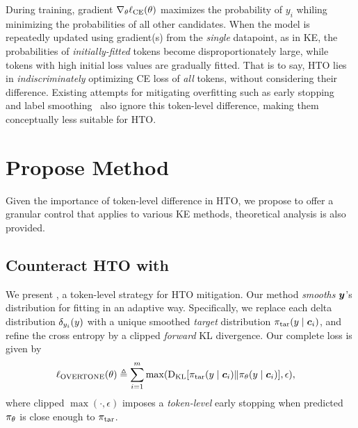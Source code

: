 During training, gradient $\nabla_\theta \ell_{\text{CE}} (\theta)$ maximizes the probability of $y_i$ whiling minimizing the probabilities of all other candidates.
When the model is repeatedly updated using gradient(s) from the \textit{single} datapoint, as in KE, 
the probabilities of \textit{initially-fitted} tokens become disproportionately large, 
while tokens with high initial loss values are gradually fitted.
That is to say, HTO lies in \textit{indiscriminately} optimizing CE loss of \textit{all} tokens, without considering their difference.
Existing attempts for mitigating overfitting such as early stopping~\citep{yao2007early} and label smoothing~\citep{szegedy2016rethinking,muller2019does} also ignore this token-level difference, making them conceptually less suitable for HTO. 


\section{Propose Method}
\label{sec:method}


Given the importance of token-level difference in HTO, 
we propose {\NAME} to offer a granular control that applies to various KE methods, theoretical analysis is also provided.  

\subsection{Counteract HTO with {\NAME}}

We present {\NAME}, a token-level strategy for HTO mitigation. 
Our method \textit{smooths} $\boldsymbol{y}$'s distribution for fitting in an adaptive way. 
Specifically,
we replace
each delta distribution $\de{y_i}{y}$ with a unique smoothed \textit{target} distribution $\pi_\text{tar}(y \mid {\boldsymbol{c}}_i)$, 
and refine the cross entropy by a clipped \textit{forward} KL divergence.
Our complete loss is given by 
\begin{align}
\label{eq:dks-loss}
\ell_{\text{OVERTONE}}(\theta)
&\triangleq 
\sum_{i=1}^m \max(\text{D}_\text{KL} [\pi_\text{tar} (y \mid {\boldsymbol{c}}_i) \| \pi_\theta(y \mid {\boldsymbol{c}}_i)], \epsilon),
\end{align}
% 
where clipped $\max(\cdot, \epsilon)$ imposes a \textit{token-level} early stopping when predicted $\pi_\theta$ is close enough to $\pi_\text{tar}$. 

